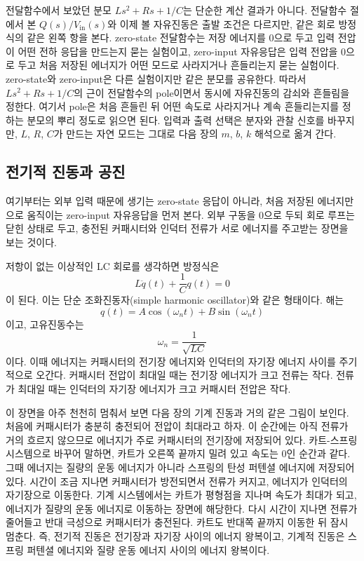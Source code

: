 전달함수에서 보았던 분모 \(Ls^2+Rs+1/C\)는 단순한 계산 결과가 아니다.
전달함수 절에서 본 \(Q(s)/V_{\mathrm{in}}(s)\)와 이제 볼 자유진동은 출발 조건은 다르지만, 같은 회로 방정식의 같은 왼쪽 항을 본다.
zero-state 전달함수는 저장 에너지를 0으로 두고 입력 전압이 어떤 전하 응답을 만드는지 묻는 실험이고, zero-input 자유응답은 입력 전압을 0으로 두고 처음 저장된 에너지가 어떤 모드로 사라지거나 흔들리는지 묻는 실험이다.
zero-state와 zero-input은 다른 실험이지만 같은 분모를 공유한다.
따라서 \(Ls^2+Rs+1/C\)의 근이 전달함수의 pole이면서 동시에 자유진동의 감쇠와 흔들림을 정한다.
여기서 pole은 처음 흔들린 뒤 어떤 속도로 사라지거나 계속 흔들리는지를 정하는 분모의 뿌리 정도로 읽으면 된다.
입력과 출력 선택은 분자와 관찰 신호를 바꾸지만, \(L\), \(R\), \(C\)가 만드는 자연 모드는 그대로 다음 장의 \(m\), \(b\), \(k\) 해석으로 옮겨 간다.

\subsection{전기적 진동과 공진}

여기부터는 외부 입력 때문에 생기는 zero-state 응답이 아니라, 처음 저장된 에너지만으로 움직이는 zero-input 자유응답을 먼저 본다.
외부 구동을 0으로 두되 회로 루프는 닫힌 상태로 두고, 충전된 커패시터와 인덕터 전류가 서로 에너지를 주고받는 장면을 보는 것이다.

저항이 없는 이상적인 LC 회로를 생각하면 방정식은
\begin{equation}
  L\ddot{q}(t)+\frac{1}{C}q(t)=0
\end{equation}
이 된다.
이는 단순 조화진동자(simple harmonic oscillator)와 같은 형태이다.
해는
\begin{equation}
  q(t)=A\cos(\omega_n t)+B\sin(\omega_n t)
\end{equation}
이고, 고유진동수는
\begin{equation}
  \omega_n=\frac{1}{\sqrt{LC}}
\end{equation}
이다.
이때 에너지는 커패시터의 전기장 에너지와 인덕터의 자기장 에너지 사이를 주기적으로 오간다.
커패시터 전압이 최대일 때는 전기장 에너지가 크고 전류는 작다.
전류가 최대일 때는 인덕터의 자기장 에너지가 크고 커패시터 전압은 작다.

이 장면을 아주 천천히 멈춰서 보면 다음 장의 기계 진동과 거의 같은 그림이 보인다.
처음에 커패시터가 충분히 충전되어 전압이 최대라고 하자.
이 순간에는 아직 전류가 거의 흐르지 않으므로 에너지가 주로 커패시터의 전기장에 저장되어 있다.
카트-스프링 시스템으로 바꾸어 말하면, 카트가 오른쪽 끝까지 밀려 있고 속도는 0인 순간과 같다.
그때 에너지는 질량의 운동 에너지가 아니라 스프링의 탄성 퍼텐셜 에너지에 저장되어 있다.
시간이 조금 지나면 커패시터가 방전되면서 전류가 커지고, 에너지가 인덕터의 자기장으로 이동한다.
기계 시스템에서는 카트가 평형점을 지나며 속도가 최대가 되고, 에너지가 질량의 운동 에너지로 이동하는 장면에 해당한다.
다시 시간이 지나면 전류가 줄어들고 반대 극성으로 커패시터가 충전된다.
카트도 반대쪽 끝까지 이동한 뒤 잠시 멈춘다.
즉, 전기적 진동은 전기장과 자기장 사이의 에너지 왕복이고, 기계적 진동은 스프링 퍼텐셜 에너지와 질량 운동 에너지 사이의 에너지 왕복이다.

